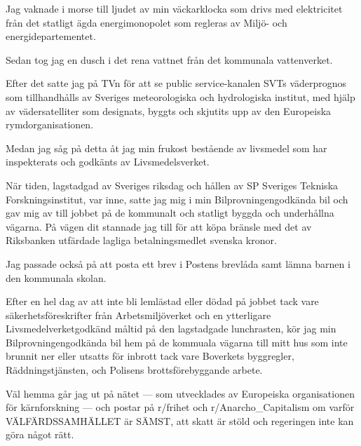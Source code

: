 \documentclass[a4paper,12pt]{article}
\newcommand{\leblanc}{\clearpage\thispagestyle{empty}\null\clearpage}
\begin{document}
\begin{sammanfattning}
% 
Jag vaknade i morse till ljudet av min väckarklocka som drivs med elektricitet från det
statligt ägda energimonopolet som regleras av Miljö- och energidepartementet.

Sedan tog jag en dusch i det rena vattnet från det kommunala vattenverket.

Efter det satte jag på TVn för att se public service-kanalen SVTs väderprognos som
tillhandhålls av Sveriges meteorologiska och hydrologiska institut, med hjälp av
vädersatelliter som designats, byggts och skjutits upp av den Europeiska
rymdorganisationen.

Medan jag såg på detta åt jag min frukost bestående av livsmedel som har inspekterats och
godkänts av Livsmedelsverket.

När tiden, lagstadgad av Sveriges riksdag och hållen av SP Sveriges Tekniska
Forskningsinstitut, var inne, satte jag mig i min Bilprovningengodkända bil och gav mig av
till jobbet på de kommunalt och statligt byggda och underhållna vägarna. På vägen dit
stannade jag till för att köpa bränsle med det av Riksbanken utfärdade lagliga
betalningsmedlet svenska kronor.

Jag passade också på att posta ett brev i Postens brevlåda samt lämna barnen i den
kommunala skolan.

Efter en hel dag av att inte bli lemlästad eller dödad på jobbet tack vare
säkerhetsföreskrifter från Arbetsmiljöverket och en ytterligare Livsmedelverketgodkänd
måltid på den lagstadgade lunchrasten, kör jag min Bilprovningengodkända bil hem på de
kommuala vägarna till mitt hus som inte brunnit ner eller utsatts för inbrott tack vare
Boverkets byggregler, Räddningstjänsten, och Polisens brottsförebyggande arbete.

Väl hemma går jag ut på nätet — som utvecklades av Europeiska organisationen för
kärnforskning — och postar på r/frihet och r/Anarcho\_Capitalism om varför
VÄLFÄRDSSAMHÄLLET är SÄMST, att skatt är stöld och regeringen inte kan göra något rätt.
\end{sammanfattning}

\leblanc

\tableofcontents

\cleardoublepage

\mainmatter
\end{document}
